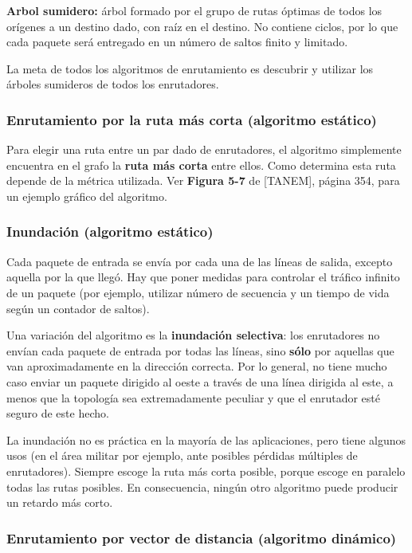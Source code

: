 \documentclass[10pt,a4paper]{article}
\begin{document}
\textbf{Arbol sumidero:} árbol formado por el grupo de rutas óptimas de todos los orígenes a un destino dado, con raíz en el destino. No contiene ciclos, por lo que cada paquete será entregado en un número de saltos finito y limitado.

La meta de todos los algoritmos de enrutamiento es descubrir y utilizar los árboles sumideros de todos los enrutadores.
\newline

\subsubsection{Enrutamiento por la ruta más corta (algoritmo estático)}

Para elegir una ruta entre un par dado de enrutadores, el algoritmo simplemente encuentra en el grafo la \textbf{ruta más corta} entre ellos. Como determina esta ruta depende de la métrica utilizada. Ver \textbf{Figura 5-7} de [TANEM], página 354, para un ejemplo gráfico del algoritmo.

\subsubsection{Inundación (algoritmo estático)}

Cada paquete de entrada se envía por cada una de las líneas de salida, excepto aquella por la que llegó. Hay que poner medidas para controlar el tráfico infinito de un paquete (por ejemplo, utilizar número de secuencia y un tiempo de vida según un contador de saltos).

Una variación del algoritmo es la \textbf{inundación selectiva}: los enrutadores no envían cada paquete de entrada por todas las líneas, sino \textbf{sólo} por aquellas que van aproximadamente en la dirección correcta. Por lo general, no tiene mucho caso enviar un paquete dirigido al oeste a través de una línea dirigida al este, a menos que la topología sea extremadamente peculiar y que el enrutador esté seguro de este hecho.

La inundación no es práctica en la mayoría de las aplicaciones, pero tiene algunos usos (en el área militar por ejemplo, ante posibles pérdidas múltiples de enrutadores). Siempre escoge la ruta más corta posible, porque escoge en paralelo todas las rutas posibles. En consecuencia, ningún otro algoritmo puede producir un retardo más corto.

\subsubsection{Enrutamiento por vector de distancia (algoritmo dinámico)}
\end{document}
